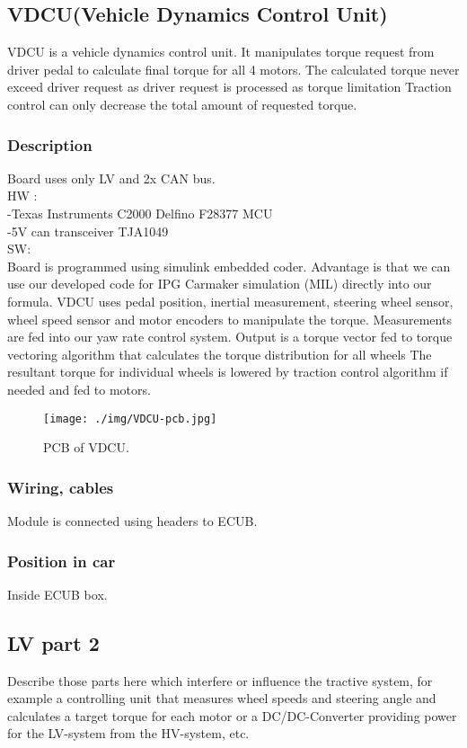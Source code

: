 \subsection{VDCU(Vehicle Dynamics Control Unit)}
VDCU is a vehicle dynamics control unit. It manipulates torque request from driver pedal to calculate final torque for all 4 motors. The calculated torque never exceed driver request as driver request is processed as torque limitation Traction control can only decrease the total amount of requested torque.

\subsubsection{Description}
Board uses only LV and 2x CAN bus.\\
HW :\\
-Texas Instruments C2000 Delfino F28377 MCU\\
-5V can transceiver TJA1049\\

\noindent SW:\\
Board is programmed using simulink embedded coder. Advantage is that we can use our developed code for IPG Carmaker simulation (MIL) directly into our formula. VDCU uses pedal position, inertial measurement, steering wheel sensor, wheel speed sensor and motor encoders to manipulate the torque. Measurements are fed into our yaw rate control system. Output is a torque vector fed to torque vectoring algorithm that calculates the torque distribution for all wheels The resultant torque for individual wheels is lowered by traction control algorithm if needed and fed to motors.

\begin{figure}[H]
	\centering
	\texttt{[image: ./img/VDCU-pcb.jpg]}
	\caption{PCB of VDCU.}
	\label{fig:VDCU-pcb}
\end{figure}

\subsubsection{Wiring, cables}
Module is connected using headers to ECUB.

\subsubsection{Position in car}
Inside ECUB box.

\subsection{LV part 2}
Describe those parts here which interfere or influence the tractive system, for example a controlling unit that measures wheel speeds and steering angle and calculates a target torque for each motor or a DC/DC-Converter providing power for the LV-system from the HV-system, etc.

